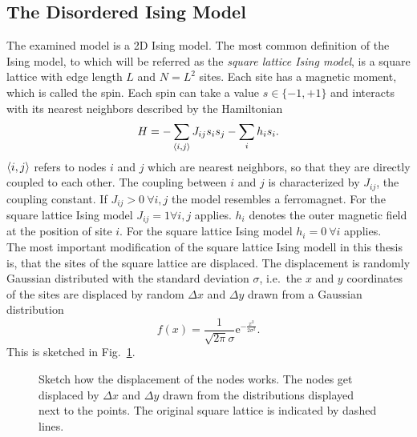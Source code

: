 \subsection{The Disordered Ising Model}
\label{ssec:isingmodel}
    The examined model is a 2D Ising model.
    The most common definition of the Ising model, to which will be referred
    as the \emph{square lattice Ising model}, is a square lattice with edge length \(L\) and
    \(N=L^2\) sites. Each site has a magnetic moment, which is called the spin. Each
    spin can take a value \(s \in \{-1,+1\}\) and interacts with its
    nearest neighbors described by the Hamiltonian
    \begin{equation}
        H = - \sum_{\left< i,j \right>}J_{ij}s_{i}s_{j} - \sum_i h_i s_i.
        \label{eq:hamiltonian}
    \end{equation}
    \(\left< i,j \right>\) refers to nodes \(i\) and \(j\) which are nearest
    neighbors, so that they are directly coupled to each other. The
    coupling between \(i\) and \(j\) is characterized by \(J_{ij}\),
    the coupling constant. If \(J_{ij} > 0 \ \forall i,j\) the model resembles a ferromagnet.
    For the square lattice Ising model \(J_{ij}=1 \forall i,j\) applies.
    \(h_i\) denotes the outer magnetic field at the position of
    site \(i\). For the square lattice Ising model \(h_i=0 \ \forall i\)
    applies.\\
    The most important modification of the square lattice Ising modell in this
    thesis is, that the sites of the square lattice are displaced.
    The displacement is randomly Gaussian distributed with the standard
    deviation \(\sigma\), i.e.\ the \(x\) and \(y\) coordinates of the
    sites are displaced by random \(\Delta x\) and \(\Delta y\) drawn
    from a Gaussian distribution
    \begin{equation}
        f(x)=\frac{1}{\sqrt{2\pi}\sigma}\mathrm{e}^{-\frac{x^2}{2\sigma^2}}.
        \label{eq:gauss}
    \end{equation}
    This is sketched in Fig.\ \ref{fig:displacement}.
    \begin{figure}[htbp]
        \centering
        
        \caption[Sketch how the Displacement works]
        {
            Sketch how the displacement of the nodes works. The nodes
            get displaced by \(\Delta x\) and \(\Delta y\) drawn from the
            distributions displayed next to the points. The original
            square lattice is indicated by dashed lines.
        }
        \label{fig:displacement}
    \end{figure}\\
